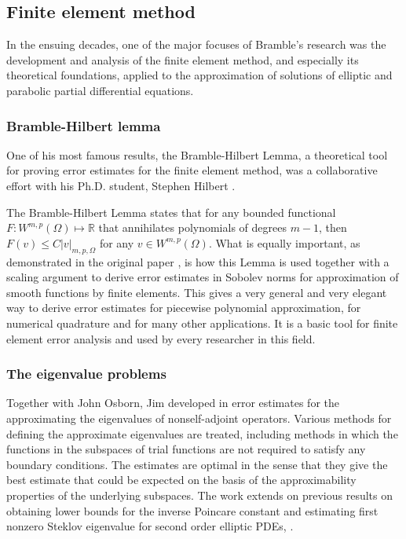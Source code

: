 \documentclass[CJK,11pt]{amsart}
\theoremstyle{definition}
\begin{document}
\begin{CJK*}{UTF8}{gbsn}
\subsection{Finite element method}
In the ensuing decades, one of the major focuses of Bramble's research
was the development and analysis of the finite element method, and
especially its theoretical foundations, applied to the approximation
of solutions of elliptic and parabolic partial differential equations.

\subsubsection{Bramble-Hilbert lemma}
One of his most famous results, the Bramble-Hilbert Lemma, a
theoretical tool for proving error estimates for the finite element
method, was a collaborative effort with his Ph.D. student, Stephen
Hilbert \cite{bramble1970estimation}.

The Bramble-Hilbert Lemma states that for any bounded functional
$F:W^{m,p}(\Omega)\mapsto\mathbb R$ that annihilates polynomials of
degrees $m-1$, then $F(v)\le C|v|_{m,p,\Omega}$ for any $v\in
W^{m,p}(\Omega)$.  What is equally important, as demonstrated in the
original paper \cite{bramble1970estimation}, is how this Lemma is
used together with a scaling argument to derive error estimates in Sobolev norms for
approximation of smooth functions by finite elements.  This
gives a very general and very elegant way to derive error estimates
for piecewise polynomial approximation, for numerical quadrature and for
many other applications.  It is a basic tool for finite element error
analysis and used by every researcher in this field.

\subsubsection{The eigenvalue problems} Together with John Osborn, Jim developed in \cite{bramble1973rate}  error estimates for the approximating the  eigenvalues of nonself-adjoint operators.
 Various methods for defining the approximate eigenvalues are treated, including methods in which the functions in the subspaces of trial functions are not required to satisfy any boundary conditions. The estimates are optimal in the sense that they give the best estimate that could be expected on the basis of the approximability properties of the underlying subspaces. The work extends on previous results on obtaining lower bounds for the inverse Poincare  constant and estimating first nonzero Steklov eigenvalue for second order elliptic PDEs, \cite{bramble1962bounds}. 


\end{CJK*}
\end{document}
